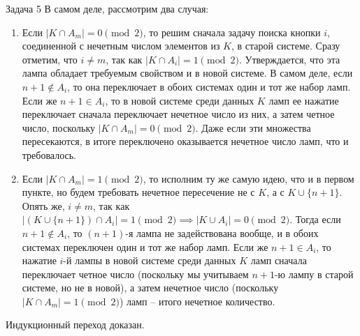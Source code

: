 \documentclass{article}
\newcommand{\abs}[1]{\lvert#1\rvert}
\begin{document}
\begin{section}{Задача 5}
		В самом деле, рассмотрим два случая:

		\begin{enumerate}
			\item Если $\abs{K \cap A_m} = 0 \pmod 2$, то решим сначала задачу поиска кнопки $i$, соединенной с нечетным числом элементов из $K$, в старой системе. Сразу отметим, что $i \ne m$, так как $\abs{K \cap A_i} = 1 \pmod 2$. Утверждается, что эта лампа обладает требуемым свойством и в новой системе. В самом деле, если $n + 1 \not\in A_i$, то она переключает в обоих системах один и тот же набор ламп. Если же $n + 1 \in A_i$, то в новой системе среди данных $K$ ламп ее нажатие переключает сначала переключает нечетное число из них, а затем четное число, поскольку $\abs{K \cap A_m} = 0 \pmod 2$. Даже если эти множества пересекаются, в итоге переключено оказывается нечетное число ламп, что и требовалось.

			\item Если $\abs{K \cap A_m} = 1 \pmod 2$, то исполним ту же самую идею, что и в первом пункте, но будем требовать нечетное пересечение не с $K$, а с $K \cup \{n + 1\}$. Опять же, $i \ne m$, так как $\abs{(K \cup \{n + 1\}) \cap A_i} = 1 \pmod 2 \implies \abs{K \cup A_i} = 0 \pmod 2$. Тогда если $n + 1 \not\in A_i$, то $(n + 1)$-я лампа не задействована вообще, и в обоих системах переключен один и тот же набор ламп. Если же $n + 1 \in A_i$, то нажатие $i$-й лампы в новой системе среди данных $K$ ламп сначала переключает четное число (поскольку мы учитываем $n + 1$-ю лампу в старой системе, но не в новой), а затем нечетное число (поскольку $\abs{K \cap A_m} = 1 \pmod 2$) ламп -- итого нечетное количество.
		\end{enumerate}

		Индукционный переход доказан.
	\end{section}
\end{document}
